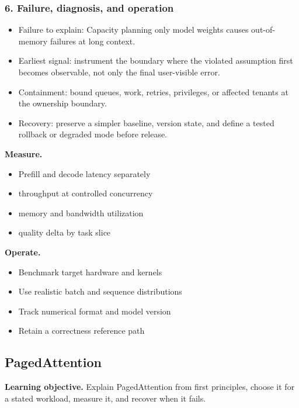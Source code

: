 \subsubsection*{6. Failure, diagnosis, and operation}
\begin{itemize}
\item Failure to explain: Capacity planning only model weights causes out-of-memory failures at long context.
\item Earliest signal: instrument the boundary where the violated assumption first becomes observable, not only the final user-visible error.
\item Containment: bound queues, work, retries, privileges, or affected tenants at the ownership boundary.
\item Recovery: preserve a simpler baseline, version state, and define a tested rollback or degraded mode before release.
\end{itemize}
\textbf{Measure.}\begin{itemize}
\item Prefill and decode latency separately
\item throughput at controlled concurrency
\item memory and bandwidth utilization
\item quality delta by task slice
\end{itemize}
\textbf{Operate.}\begin{itemize}
\item Benchmark target hardware and kernels
\item Use realistic batch and sequence distributions
\item Track numerical format and model version
\item Retain a correctness reference path
\end{itemize}
\subsection{PagedAttention}
\textbf{Learning objective.} Explain PagedAttention from first principles, choose it for a stated workload, measure it, and recover when it fails.
